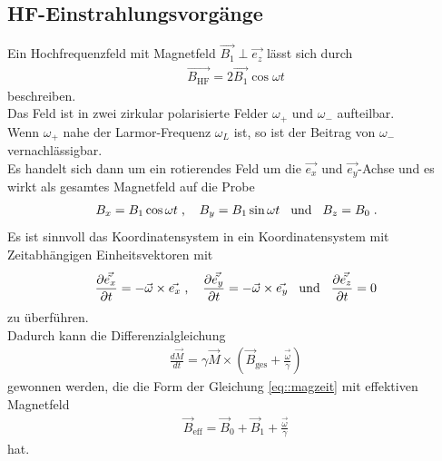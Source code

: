 \documentclass[]{scrartcl}
\begin{document}
\subsection{HF-Einstrahlungsvorgänge}
Ein Hochfrequenzfeld mit Magnetfeld $\vec{B_1} \perp \vec{e_z}$ lässt sich durch
\begin{align}
\vec{B_{\text{HF}}}=2\vec{B_1} \cos \omega t
\end{align}
beschreiben.\\
Das Feld ist in zwei zirkular polarisierte Felder $\omega_+$ und $\omega_-$ aufteilbar.\\
Wenn $\omega_+$ nahe der Larmor-Frequenz $\omega_L$ ist, so ist der Beitrag von $\omega_-$ vernachlässigbar.\\
Es handelt sich dann um ein rotierendes Feld um die $\vec{e_x}$ und $\vec{e_y}$-Achse und es wirkt als gesamtes Magnetfeld auf die Probe
\begin{align*}
B_x=B_1 \cos \omega t \hspace*{0.1cm}\text{,}\hspace*{0.4cm} B_y=B_1 \sin \omega t \hspace*{0.3cm}\text{und}\hspace*{0.3cm} B_z=B_0\hspace*{0.1cm}\text{.}
\end{align*}
Es ist sinnvoll das Koordinatensystem in ein Koordinatensystem mit Zeitabhängigen Einheitsvektoren mit
\begin{align}
\frac{\partial \vec{\tilde{e_x}}}{\partial t}= -\vec{\omega} \times \vec{e_x}\hspace*{0.1cm}\text{,}\hspace*{0.4cm}
\frac{\partial \vec{\tilde{e_y}}}{\partial t}= -\vec{\omega} \times \vec{e_y}\hspace*{0.3cm}\text{und}\hspace*{0.3cm}
\frac{\partial \vec{\tilde{e_z}}}{\partial t}= 0
\end{align}
zu überführen.\\
Dadurch kann die Differenzialgleichung 
\begin{align}
\frac{d \vec{M}}{d t}= \gamma \vec{M}\times \left(\vec{B}_{\text{ges}}+\frac{\vec{\omega}}{\gamma}\right)
\end{align}
gewonnen werden, die die Form der Gleichung \ref{eq::magzeit} mit effektiven Magnetfeld
\begin{align}
\vec{B}_\text{eff}=\vec{B}_0+\vec{B}_1+\frac{\vec{\omega}}{\gamma}
\end{align}
hat.\\
\end{document}
